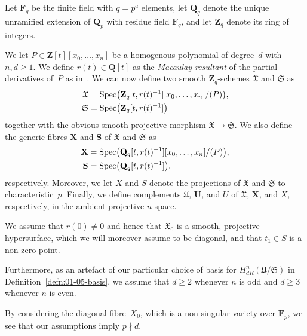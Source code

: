 \begin{notation} \label{not:01-03-main}
Let $\mathbf{F}_q$ be the finite field with $q = p^a$ elements, 
let $\mathbf{Q}_q$ denote the unique unramified extension of $\mathbf{Q}_p$ 
with residue field $\mathbf{F}_q$, and let $\mathbf{Z}_q$ denote its 
ring of integers.

We let $P \in \mathbf{Z}[t][x_0,\dotsc,x_n]$ be a homogenous polynomial 
of degree~$d$ with $n, d \geq 1$.  We define $r(t) \in \mathbf{Q}[t]$ as 
the \emph{Macaulay resultant} of the partial derivatives of~$P$ as 
in~\citep[Page~7, Chapter~I.6]{Macaulay1994}.  We can now define two 
smooth $\mathbf{Z}_q$-schemes $\mathfrak{X}$ and $\mathfrak{S}$ as 
\begin{align*}
\mathfrak{X} & = \operatorname{Spec}\bigl( \mathbf{Z}_q[t,r(t)^{-1}][x_0,\dotsc,x_n] / (P)\bigr), \\
\mathfrak{S} & = \operatorname{Spec}\bigl( \mathbf{Z}_q[t,r(t)^{-1}] \bigr)
\end{align*}
together with the obvious smooth projective morphism 
$\mathfrak{X} \to \mathfrak{S}$.  We also define the generic fibres 
$\mathbf{X}$ and $\mathbf{S}$ of $\mathfrak{X}$ and $\mathfrak{S}$ as 
\begin{align*}
\mathbf{X} & = \operatorname{Spec}\bigl( \mathbf{Q}_q[t,r(t)^{-1}][x_0,\dotsc,x_n] / (P)\bigr), \\
\mathbf{S} & = \operatorname{Spec}\bigl( \mathbf{Q}_q[t,r(t)^{-1}] \bigr),
\end{align*}
respectively.  Moreover, we let $X$ and $S$ denote the projections 
of $\mathfrak{X}$ and $\mathfrak{S}$ to characteristic~$p$. 
Finally, we define complements $\mathfrak{U}$, $\mathbf{U}$, and $U$ 
of $\mathfrak{X}$, $\mathbf{X}$, and $X$, respectively, in the 
ambient projective $n$-space.

We assume that $r(0) \neq 0$ and hence that $\mathfrak{X}_0$ is a 
smooth, projective hypersurface, which we will moreover assume to be 
diagonal, and that $t_1 \in S$ is a non-zero point.
\end{notation}

\begin{notation}
Furthermore, as an artefact of our particular choice of basis for 
$H_{dR}^n(\mathfrak{U}/\mathfrak{S})$ in Definition~\ref{defn:01-05-basis}, 
we assume that $d \geq 2$ whenever $n$ is odd and $d \geq 3$ whenever $n$ 
is even.
\end{notation}

\begin{rem}
By considering the diagonal fibre~$X_0$, which is a non-singular variety 
over $\mathbf{F}_p$, we see that our assumptions imply $p \nmid d$.
\end{rem}

